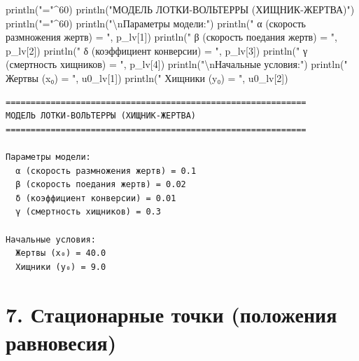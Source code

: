 \documentclass[
  12pt,
  a4paper,
  DIV=11,
  numbers=noendperiod]{scrreprt}
\newenvironment{Shaded}{\begin{snugshade}}{\end{snugshade}}
\newcommand{\FloatTok}[1]{\textcolor[rgb]{0.68,0.00,0.00}{#1}}
\newcommand{\FunctionTok}[1]{\textcolor[rgb]{0.28,0.35,0.67}{#1}}
\newcommand{\NormalTok}[1]{\textcolor[rgb]{0.00,0.23,0.31}{#1}}
\newcommand{\OperatorTok}[1]{\textcolor[rgb]{0.37,0.37,0.37}{#1}}
\newcommand{\SpecialCharTok}[1]{\textcolor[rgb]{0.37,0.37,0.37}{#1}}
\newcommand{\StringTok}[1]{\textcolor[rgb]{0.13,0.47,0.30}{#1}}
\begin{document}
\begin{Shaded}
\begin{Highlighting}[]
\FunctionTok{println}\NormalTok{(}\StringTok{"="}\OperatorTok{\^{}}\FloatTok{60}\NormalTok{)}
\FunctionTok{println}\NormalTok{(}\StringTok{"МОДЕЛЬ ЛОТКИ{-}ВОЛЬТЕРРЫ (ХИЩНИК{-}ЖЕРТВА)"}\NormalTok{)}
\FunctionTok{println}\NormalTok{(}\StringTok{"="}\OperatorTok{\^{}}\FloatTok{60}\NormalTok{)}
\FunctionTok{println}\NormalTok{(}\StringTok{"}\SpecialCharTok{\textbackslash{}n}\StringTok{Параметры модели:"}\NormalTok{)}
\FunctionTok{println}\NormalTok{(}\StringTok{"  α (скорость размножения жертв) = "}\NormalTok{, p\_lv[}\FloatTok{1}\NormalTok{])}
\FunctionTok{println}\NormalTok{(}\StringTok{"  β (скорость поедания жертв) = "}\NormalTok{, p\_lv[}\FloatTok{2}\NormalTok{])}
\FunctionTok{println}\NormalTok{(}\StringTok{"  δ (коэффициент конверсии) = "}\NormalTok{, p\_lv[}\FloatTok{3}\NormalTok{])}
\FunctionTok{println}\NormalTok{(}\StringTok{"  γ (смертность хищников) = "}\NormalTok{, p\_lv[}\FloatTok{4}\NormalTok{])}
\FunctionTok{println}\NormalTok{(}\StringTok{"}\SpecialCharTok{\textbackslash{}n}\StringTok{Начальные условия:"}\NormalTok{)}
\FunctionTok{println}\NormalTok{(}\StringTok{"  Жертвы (x₀) = "}\NormalTok{, u0\_lv[}\FloatTok{1}\NormalTok{])}
\FunctionTok{println}\NormalTok{(}\StringTok{"  Хищники (y₀) = "}\NormalTok{, u0\_lv[}\FloatTok{2}\NormalTok{])}
\end{Highlighting}
\end{Shaded}

\begin{verbatim}
============================================================
МОДЕЛЬ ЛОТКИ-ВОЛЬТЕРРЫ (ХИЩНИК-ЖЕРТВА)
============================================================

Параметры модели:
  α (скорость размножения жертв) = 0.1
  β (скорость поедания жертв) = 0.02
  δ (коэффициент конверсии) = 0.01
  γ (смертность хищников) = 0.3

Начальные условия:
  Жертвы (x₀) = 40.0
  Хищники (y₀) = 9.0
\end{verbatim}

\section{7. Стационарные точки (положения
равновесия)}\label{ux441ux442ux430ux446ux438ux43eux43dux430ux440ux43dux44bux435-ux442ux43eux447ux43aux438-ux43fux43eux43bux43eux436ux435ux43dux438ux44f-ux440ux430ux432ux43dux43eux432ux435ux441ux438ux44f}
\end{document}
